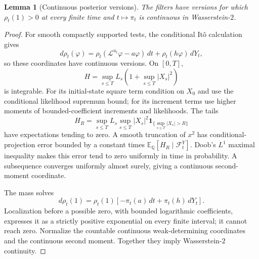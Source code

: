 \documentclass[11pt,a4paper]{article}
\newtheorem{lemma}[theorem]{Lemma}
\theoremstyle{definition}
\theoremstyle{remark}
\newcommand{\E}{\mathbb E}
\newcommand{\Qq}{\mathbb Q}
\newcommand{\ind}{\mathbf 1}
\begin{document}
\begin{lemma}[Continuous posterior versions]\label{lem:versions}
The filters have versions for which \(\rho_t(1)>0\) at every finite
time and \(t\mapsto\pi_t\) is continuous in Wasserstein-\(2\).
\end{lemma}
\begin{proof}
For smooth compactly supported tests, the conditional Itô calculation
gives
\[
 d\rho_t(\varphi)=
 \rho_t(\mathcal L^{u_t}\varphi-a\varphi)\,dt+
 \rho_t(h\varphi)\,dY_t,
\]
so these coordinates have continuous versions. On \([0,T]\),
\[
 H=\sup_{s\leq T}L_s\left(1+\sup_{s\leq T}|X_s|^2\right)
\]
is integrable. For its initial-state square term condition on \(X_0\)
and use the conditional likelihood supremum bound; for its increment
terms use higher moments of bounded-coefficient increments and
likelihoods. The tails
\[
 H_R=\sup_{s\leq T}L_s\sup_{s\leq T}|X_s|^2
                 \ind_{\{\sup_{s\leq T}|X_s|>R\}}
\]
have expectations tending to zero. A smooth truncation of \(x^2\)
has conditional-projection error bounded by a constant times
\(\E_\Qq[H_R\mid\mathcal F_t^Y]\). Doob's \(L^1\) maximal inequality
makes this error tend to zero uniformly in time in probability.
A subsequence converges uniformly almost surely, giving a continuous
second-moment coordinate.

The mass solves
\[
 d\rho_t(1)=\rho_t(1)
       [-\pi_t(a)\,dt+\pi_t(h)\,dY_t].
\]
Localization before a possible zero, with bounded logarithmic
coefficients, expresses it as a strictly positive exponential on
every finite interval; it cannot reach zero. Normalize the countable
continuous weak-determining coordinates and the continuous second
moment. Together they imply Wasserstein-\(2\) continuity.
\end{proof}
\end{document}

